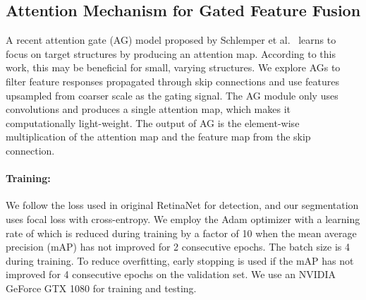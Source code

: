 \documentclass[runningheads,a4paper]{llncs}
\begin{document}
\vspace{-3mm}
\subsection{Attention Mechanism for Gated Feature Fusion}



A recent attention gate (AG) model proposed by Schlemper et al.~\cite{schlemper2019attention} learns to focus on target structures by producing an attention map. According to this work, this may be beneficial for small, varying structures.
We explore AGs to filter feature responses propagated through skip connections and use features upsampled from coarser scale as the gating signal.
The AG module only uses  convolutions and produces a single attention map, which makes it computationally light-weight.
The output of AG is the element-wise multiplication of the attention map and the feature map from the skip connection. 



\vspace{-3mm}
\paragraph{\textbf{Training:}} We follow the loss used in original RetinaNet for detection, and our segmentation uses focal loss with cross-entropy.
We employ the Adam optimizer with a learning rate of  which is reduced during training by a factor of 10 when the mean average precision (mAP) has not improved for 2 consecutive epochs. The batch size is 4 during training. To reduce overfitting, early stopping is used if the mAP has not improved for 4 consecutive epochs on the validation set. We use an NVIDIA GeForce GTX 1080 for training and testing.
\end{document}
